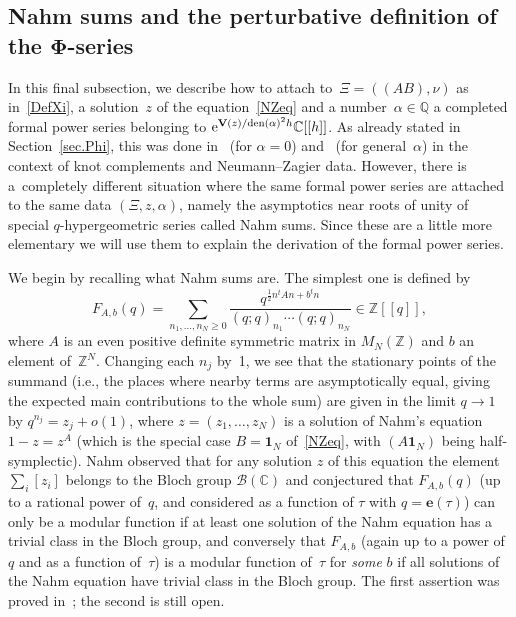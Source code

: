 \documentclass[pdftex]{sigma}
\numberwithin{equation}{section}
\def\e{\mathbf{e}}
\def\a{\alpha}
\def\C{\mathbb C}
\def\Z{\mathbb Z}
\def\Q{\mathbb Q}
\def\e{\mathbf{e}}
\def\a{\alpha}
\def\den{\mathrm{den}}
\def\o{o}
\def\V{\mathbf V}
\def\be{\begin{equation}}
\def\ee{\end{equation}}
\def\B{\mathcal B} \def\hB{\widehat\B}
\begin{document}
\subsection[Nahm sums and the perturbative definition of the Phi-series]{Nahm sums and the perturbative definition of the $\boldsymbol{\Phi}$-series}
\label{sub.PhiPerturbative}

In this final subsection, we describe how to attach to~$\Xi=((A B),\nu)$ as
in~\eqref{DefXi}, a solution~$z$ of the equation~\eqref{NZeq} and a number~$\a\in\Q$
a completed formal power series belonging to ${\rm e}^{\V(z)/\den(\a)^2h} \C[[h]]$.
As already stated in Section~\ref{sec.Phi}, this was done in~\cite{DG} (for $\a=0$)
and~\cite{DG2} (for general~$\a$) in the context of knot complements and
Neumann--Zagier data. However, there is a~completely different situation where the same
formal power series are attached to the same data $(\Xi,z,\a)$, namely the asymptotics
near roots of unity of special \hbox{$q$-hypergeometric} series called Nahm sums.
Since these are a little more elementary we will use them to explain the derivation of
the formal power series.

We begin by recalling what Nahm sums are. The simplest one is defined by
\be
\label{Nahm1}
F_{A,b}(q)= \sum_{n_1,\dots,n_N\ge0}
\frac{q^{\frac12n^tAn+b^tn}}{(q;q)_{n_1}\cdots(q;q)_{n_N}}\in \Z[[q]] ,
\ee
where $A$ is an even positive definite symmetric matrix in $M_N(\Z)$ and $b$ an
element of~$\Z^N$. Changing each $n_j$ by~1, we see that the stationary points of the
summand (i.e., the places where nearby terms are asymptotically equal, giving the
expected main contributions to the whole sum)
 are given in the limit $q\to1$ by $q^{n_j}=z_j+\o(1)$, where $z=(z_1,\dots,z_N)$
is a solution of Nahm's equation $1-z=z^A$ (which is the special case $B=\mathbf1_N$
of~\eqref{NZeq}, with $(A \mathbf1_N)$ being half-symplectic). Nahm observed
that for any solution $z$ of this equation the element $\sum_i[z_i]$ belongs
to the Bloch group $\B(\C)$ and conjectured that $F_{A,b}(q)$ (up to a rational
power of~$q$, and considered as a function of $\tau$ with $q=\e(\tau)$)
can only be a modular function if at least one solution of the Nahm equation
has a trivial class in the Bloch group, and conversely that $F_{A,b}$ (again up
to a power of~$q$ and as a function of~$\tau$) is a modular function of~$\tau$
for \emph{some} $b$ if all solutions of the Nahm equation have trivial class
in the Bloch group. The first assertion was proved in~\cite{CGZ}; the second
is still open.
\end{document}
